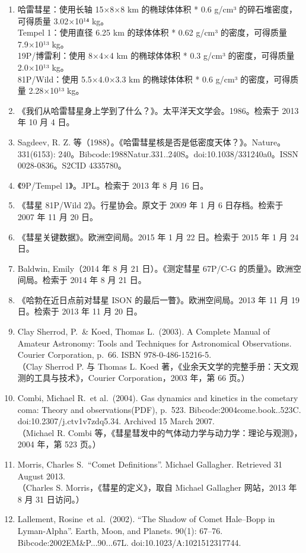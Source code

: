 \begin{enumerate}
\item 哈雷彗星：使用长轴 15×8×8 km 的椭球体体积 * 0.6 g/cm³ 的碎石堆密度，可得质量 3.02×10¹⁴ kg。\\
Tempel 1：使用直径 6.25 km 的球体体积 * 0.62 g/cm³ 的密度，可得质量 7.9×10¹³ kg。\\
19P/博雷利：使用 8×4×4 km 的椭球体体积 * 0.3 g/cm³ 的密度，可得质量 2.0×10¹³ kg。\\
81P/Wild：使用 5.5×4.0×3.3 km 的椭球体体积 * 0.6 g/cm³ 的密度，可得质量 2.28×10¹³ kg。
\item 《我们从哈雷彗星身上学到了什么？》。太平洋天文学会。1986。检索于 2013 年 10 月 4 日。
\item Sagdeev, R. Z. 等（1988）。《哈雷彗星核是否是低密度天体？》。Nature。331(6153): 240。Bibcode:1988Natur.331..240S。doi:10.1038/331240a0。ISSN 0028-0836。S2CID 4335780。
\item 《9P/Tempel 1》。JPL。检索于 2013 年 8 月 16 日。
\item 《彗星 81P/Wild 2》。行星协会。原文于 2009 年 1 月 6 日存档。检索于 2007 年 11 月 20 日。
\item 《彗星关键数据》。欧洲空间局。2015 年 1 月 22 日。检索于 2015 年 1 月 24 日。
\item Baldwin, Emily（2014 年 8 月 21 日）。《测定彗星 67P/C-G 的质量》。欧洲空间局。检索于 2014 年 8 月 21 日。
\item 《哈勃在近日点前对彗星 ISON 的最后一瞥》。欧洲空间局。2013 年 11 月 19 日。检索于 2013 年 11 月 20 日。
\item Clay Sherrod, P.\ \& Koed, Thomas L.\ (2003). A Complete Manual of Amateur Astronomy: Tools and Techniques for Astronomical Observations. Courier Corporation, p.~66. ISBN 978-0-486-15216-5.\\
（Clay Sherrod P. 与 Thomas L. Koed 著，《业余天文学的完整手册：天文观测的工具与技术》，Courier Corporation，2003 年，第 66 页。）
\item Combi, Michael R.\ et al.\ (2004). Gas dynamics and kinetics in the cometary coma: Theory and observations(PDF), p.~523. Bibcode:2004come.book..523C. doi:10.2307/j.ctv1v7zdq5.34. Archived 15 March 2007.\\
（Michael R. Combi 等，《彗星彗发中的气体动力学与动力学：理论与观测》，2004 年，第 523 页。）
\item Morris, Charles S.\ “Comet Definitions”. Michael Gallagher. Retrieved 31 August 2013.\\
（Charles S. Morris，《彗星的定义》，取自 Michael Gallagher 网站，2013 年 8 月 31 日访问。）
\item Lallement, Rosine\ et al.\ (2002). “The Shadow of Comet Hale–Bopp in Lyman-Alpha”. Earth, Moon, and Planets. 90(1): 67–76. Bibcode:2002EM\&P...90...67L. doi:10.1023/A:1021512317744.\\

\end{enumerate}
